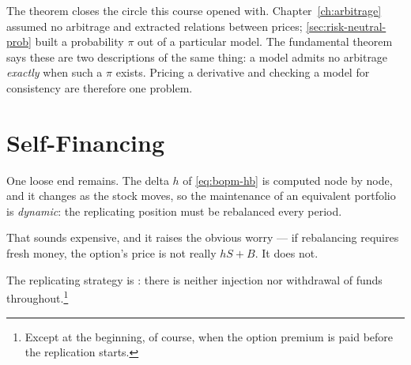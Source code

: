 \suppstart
\begin{note}
	The theorem closes the circle this course opened with.
	Chapter~\ref{ch:arbitrage} assumed no arbitrage and extracted relations between prices; \autoref{sec:risk-neutral-prob} built a probability $\pi$ out of a particular model.
	The fundamental theorem says these are two descriptions of the same thing: a model admits no arbitrage \emph{exactly} when such a $\pi$ exists.
	Pricing a derivative and checking a model for consistency are therefore one problem.
\end{note}
\suppend

\section{Self-Financing}
\label{sec:self-financing}


\suppstart
One loose end remains.
\suppend
The delta $h$ of \eqref{eq:bopm-hb} is computed node by node, and it changes as the stock moves, so the maintenance of an equivalent portfolio is \emph{dynamic}: the replicating position must be rebalanced every period.

\suppstart
That sounds expensive, and it raises the obvious worry --- if rebalancing requires fresh money, the option's price is not really $hS+B$.
It does not.
\suppend

\begin{proposition}
	\label{prop:self-financing}
	The replicating strategy is : there is neither injection nor withdrawal of funds throughout.\footnote{Except at the beginning, of course, when the option premium is paid before the replication starts.}
\end{proposition}

